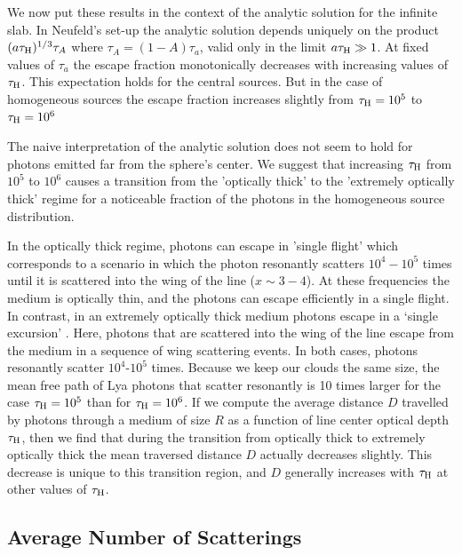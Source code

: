 \documentclass{emulateapj}
\newcommand{\ly}{{\ifmmode{{\rm Ly}\alpha~}\else{Ly$\alpha$~}\fi}}
\begin{document}
We now put these results in the context of the analytic solution for
the infinite slab\citep{Neufeld90}.   
In Neufeld's set-up the analytic solution depends
uniquely on the product $(a\tau_{\rm   H})^{1/3}\tau_{A}$ where
$\tau_{A} = (1 - A)\tau_{a}$, valid only in the limit $a\tau_{\rm
  H}\gg 1$. 
At fixed values of $\tau_{a}$ the escape fraction monotonically
decreases with increasing values of $\tau_{\rm H}$. 
This expectation holds for the central sources. 
But in the case of homogeneous sources the escape fraction increases
slightly from $\tau_{\rm H}=10^5$ to $\tau_{\rm H}=10^{6}$ 

The naive interpretation of the analytic solution does not seem to
hold for photons emitted far from the sphere's center. 
We suggest that increasing $\tau_{\rm H}$ from $10^{5}$ to $10^{6}$ causes a
transition from the 'optically thick' to  the 'extremely optically
thick' regime for a noticeable fraction of the photons in the
homogeneous source distribution.

In the optically thick regime, \ly  photons can escape in
'single flight' which corresponds to a scenario in which the
photon resonantly scatters $10^4-10^5$ times until it is scattered
into the wing of the line ($x\sim 3-4$). 
At these frequencies the medium is optically thin, and the photons can
escape efficiently in a single flight. 
In contrast, in an extremely optically thick medium \ly
  photons escape in a `single excursion' \citep{Adams72}. 
Here, photons that are scattered into the wing of the line escape from
the medium in a sequence of wing scattering events. 
In both cases, \ly photons resonantly scatter $10^4$-$10^5$ times. 
Because we keep our clouds the same size, the mean free path of Lya
photons that scatter resonantly is 10 times larger for the case
$\tau_{\rm H}=10^5$ than for $\tau_{\rm H}=10^6$. 
If we compute the average distance $D$ travelled by \ly
photons through a medium of size $R$ as a function of line center
optical depth $\tau_{\rm H}$, then we find that during the transition
from optically thick to extremely optically thick the mean traversed
distance $D$ actually decreases slightly.  
This decrease is unique to this transition region, and $D$ generally
increases with $\tau_{\rm H}$ at other values of $\tau_{\rm H}$.   

\subsection{Average Number of Scatterings}
\label{sec:scatterings}
\end{document}
